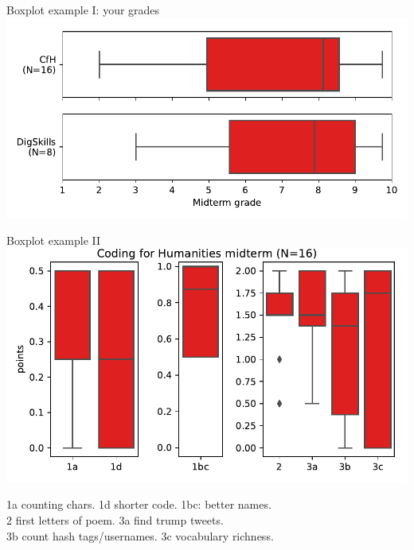 \documentclass[aspectratio=169,usenames,dvipsnames]{beamer}
\begin{document}
\begin{frame}{Boxplot example I: your grades}\centering
\includegraphics[height=0.8\textheight]{fig/boxplot}
\end{frame}

\begin{frame}{Boxplot example II}\centering
\includegraphics[height=0.75\textheight]{fig/boxplotcmp}

1a counting chars. 1d shorter code. 1bc: better names. \\
2 first letters of poem. 3a find trump tweets. \\
3b count hash tags/usernames. 3c vocabulary richness.
\end{frame}
\end{document}
